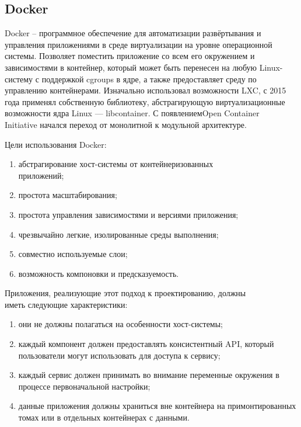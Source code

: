 \subsection{Docker}
\label{sec:development:docker}

Docker -- программное обеспечение для автоматизации развёртывания и управления приложениями в среде виртуализации на уровне операционной системы. Позволяет поместить приложение со всем его окружением и зависимостями в контейнер, который может быть перенесен на любую Linux-систему с поддержкой cgroups в ядре, а также предоставляет среду по управлению контейнерами. Изначально использовал возможности LXC, с 2015 года применял собственную библиотеку, абстрагирующую виртуализационные возможности ядра Linux — libcontainer. С появлением ​Open Container \\Initiative начался переход от монолитной к модульной архитектуре.

Цели использования Docker:
\begin{enumerate}
  \item абстрагирование хост-системы от контейнеризованных \\при\-ло\-же\-ний;
  \item простота масштабирования;
  \item простота управления зависимостями и версиями приложения;
  \item чрезвычайно легкие, изолированные среды выполнения;
  \item совместно используемые слои;
  \item возможность компоновки и предсказуемость.
\end{enumerate}

Приложения, реализующие этот подход к проектированию, должны \\иметь следующие характеристики:
\begin{enumerate}
  \item они не должны полагаться на особенности хост-системы;
  \item каждый компонент должен предоставлять консистентный API, который пользователи могут использовать для доступа к сервису;
  \item каждый сервис должен принимать во внимание переменные окружения в процессе первоначальной настройки;
  \item данные приложения должны храниться вне контейнера на примонтированных томах или в отдельных контейнерах с данными.
\end{enumerate}
